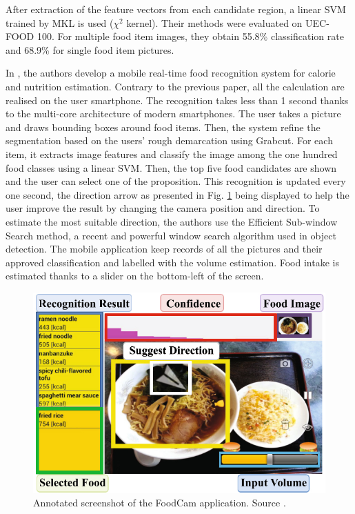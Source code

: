 After extraction of the feature vectors from each candidate region, a linear SVM trained by MKL is used ($\chi^2$ kernel). Their methods were evaluated on UEC-FOOD 100. For multiple food item images, they obtain 55.8\% classification rate and 68.9\% for single food item pictures.


In \cite{Kawano2014a}, the authors develop a mobile real-time food recognition system for calorie and nutrition estimation. Contrary to the previous paper, all the calculation are realised on the user smartphone. The recognition takes less than 1 second thanks to the multi-core architecture of modern smartphones.
The user takes a picture and draws bounding boxes around food items. Then, the system refine the segmentation based on the users' rough demarcation using Grabcut.
For each item, it extracts image features and classify the image among the one hundred food classes using a linear SVM. Then, the top five food candidates are shown and the user can select one of the proposition.
This recognition is updated every one second, the direction arrow as presented in Fig. \ref{fig:food_cam} being displayed to help the user improve the result by changing the camera position and direction. To estimate the most suitable direction, the authors use the Efficient Sub-window Search method, a recent and powerful window search algorithm used in object detection.
The mobile application keep records of all the pictures and their approved classification and labelled with the volume estimation. Food intake is estimated thanks to a slider on the bottom-left of the screen.

\begin{figure}
    \centering
    \includegraphics[scale=0.6]{img/foodcam.jpg}
    \caption[Annotated screenshot of the FoodCam application]{Annotated screenshot of the FoodCam application. Source \cite{Kawano2014a}.}
    \label{fig:food_cam}
\end{figure}

